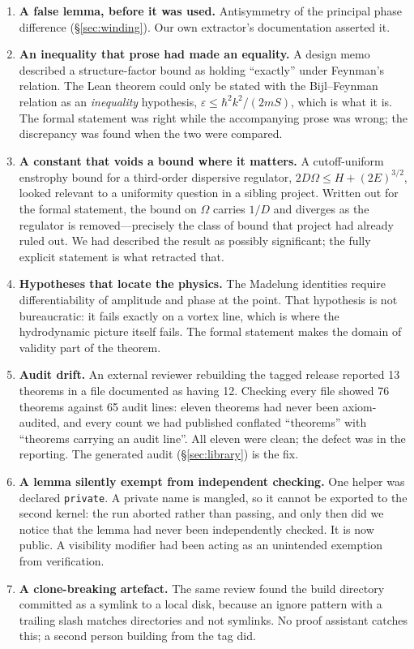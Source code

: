 \documentclass[11pt,a4paper]{article}
\theoremstyle{definition}
\newcommand{\lean}[1]{\texttt{\small #1}}
\begin{document}
\begin{enumerate}[leftmargin=*,itemsep=3pt]
\item \textbf{A false lemma, before it was used.} Antisymmetry of the principal phase
  difference (\S\ref{sec:winding}). Our own extractor's documentation asserted it.
\item \textbf{An inequality that prose had made an equality.} A design memo described a
  structure-factor bound as holding ``exactly'' under Feynman's relation. The Lean theorem
  could only be stated with the Bijl--Feynman relation as an \emph{inequality} hypothesis,
  $\varepsilon\le\hbar^2k^2/(2mS)$, which is what it is. The formal statement was right
  while the accompanying prose was wrong; the discrepancy was found when the two were
  compared.
\item \textbf{A constant that voids a bound where it matters.} A cutoff-uniform enstrophy
  bound for a third-order dispersive regulator, $2D\Omega\le H+(2E)^{3/2}$, looked relevant
  to a uniformity question in a sibling project. Written out for the formal statement, the
  bound on $\Omega$ carries $1/D$ and diverges as the regulator is removed---precisely the
  class of bound that project had already ruled out. We had described the result as
  possibly significant; the fully explicit statement is what retracted that.
\item \textbf{Hypotheses that locate the physics.} The Madelung identities require
  differentiability of amplitude and phase at the point. That hypothesis is not
  bureaucratic: it fails exactly on a vortex line, which is where the hydrodynamic picture
  itself fails. The formal statement makes the domain of validity part of the theorem.
\item \textbf{Audit drift.} An external reviewer rebuilding the tagged release reported 13
  theorems in a file documented as having 12. Checking every file showed 76 theorems against
  65 audit lines: eleven theorems had never been axiom-audited, and every count we had
  published conflated ``theorems'' with ``theorems carrying an audit line''. All eleven were
  clean; the defect was in the reporting. The generated audit (\S\ref{sec:library}) is the fix.
\item \textbf{A lemma silently exempt from independent checking.} One helper was declared
  \lean{private}. A private name is mangled, so it cannot be exported to the second kernel:
  the run aborted rather than passing, and only then did we notice that the lemma had never
  been independently checked. It is now public. A visibility modifier had been acting as an
  unintended exemption from verification.
\item \textbf{A clone-breaking artefact.} The same review found the build directory
  committed as a symlink to a local disk, because an ignore pattern with a trailing slash
  matches directories and not symlinks. No proof assistant catches this; a second person
  building from the tag did.
\end{enumerate}
\end{document}
